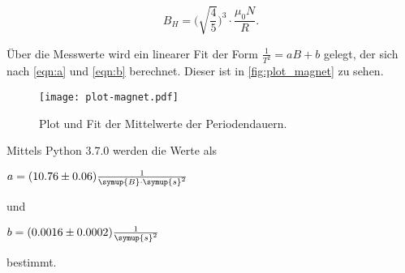 \begin{equation}
    B_H = \bigg( \sqrt{\frac{4}{5}} \bigg)^3 \cdot \frac{\mu_0 N}{R}.
\end{equation}

Über die Messwerte wird ein linearer Fit der Form $\frac{1}{T^2} = aB + b$ gelegt, der sich nach \eqref{eqn:a} und \eqref{eqn:b} berechnet.
Dieser ist in \autoref{fig:plot_magnet} zu sehen.

\begin{figure}
  \centering
  \texttt{[image: plot-magnet.pdf]}
  \caption{Plot und Fit der Mittelwerte der Periodendauern.}
  \label{fig:plot_magnet}
\end{figure}

Mittels Python 3.7.0 werden die Werte als

\centerline{$a = (10.76 \pm 0.06) \frac{1}{\symup{B} \cdot \symup{s}^2}$}

und

\centerline{$b = (0.0016 \pm 0.0002) \frac{1}{\symup{s}^2}$}

bestimmt.